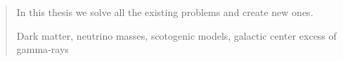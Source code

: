 \begin{abstract}

In this thesis we solve all the existing problems and create new ones.

   \begin{keywords}
    	Dark matter, neutrino masses, scotogenic models, galactic center excess of gamma-rays
   \end{keywords}

\end{abstract}
